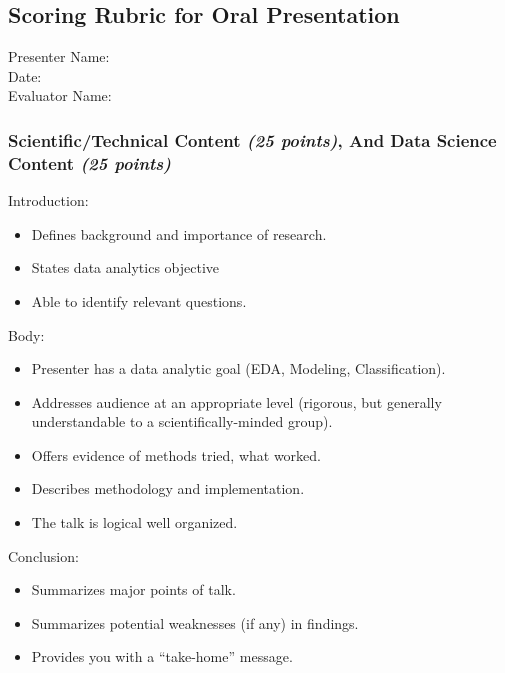 \documentclass[10pt]{article} %
\begin{document}
  \pagebreak
    \subsection{Scoring Rubric for Oral Presentation}
    Presenter Name:   \\
    Date: \\
    Evaluator Name:

      \subsubsection{Scientific/Technical Content \emph{(25 points)}, And Data Science Content \emph{(25 points)}}

      Introduction:
        \begin{itemize}   \itemsep0pt
            \item{Defines background and importance of research.}
            \item{States data analytics objective}
            \item{Able to identify relevant questions.}
        \end{itemize}

      \noindent Body:
        \begin{itemize}  \itemsep0pt
            \item{Presenter has a data analytic goal (EDA, Modeling, Classification).}
            \item{Addresses audience at an appropriate level (rigorous, but generally understandable to a scientifically-minded group).}
            \item{Offers evidence of methods tried, what worked.}
            \item{Describes methodology and implementation.}
            \item{The talk is logical well organized.}
        \end{itemize}

      \noindent Conclusion:
        \begin{itemize}  \itemsep0pt
            \item{Summarizes major points of talk.}
            \item{Summarizes potential weaknesses (if any) in findings.}
            \item{Provides you with a “take-home” message.}
        \end{itemize}
\end{document}

